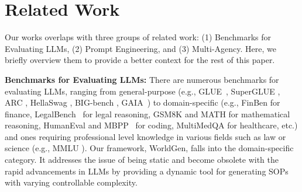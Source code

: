 \section{Related Work}
Our works overlaps with three groups of related work: (1) Benchmarks for Evaluating LLMs, (2) Prompt Engineering, and (3) Multi-Agency. Here, we briefly overview them to provide a better context for the rest of this paper. 

\textbf{Benchmarks for Evaluating LLMs:}  There are numerous benchmarks for evaluating LLMs, ranging from general-purpose (e.g., GLUE~\cite{wang2018glue}, SuperGLUE \cite{wang2019superglue}, ARC \cite{clark2018think}, HellaSwag \cite{zellers2019hellaswag}, BIG-bench \cite{srivastava2022beyond}, GAIA~\cite{gaia}) to domain-specific (e.g., FinBen \cite{xie2024finben} for finance, LegalBench~\cite{guha2024legalbench} for legal reasoning, GSM8K \cite{gsm8k} and MATH \cite{mmlu} for mathematical reasoning, HumanEval \cite{chen2021evaluating} and MBPP~\cite{austin2021program} for coding, MultiMedQA \cite{singhal2023large} for healthcare, etc.) and ones requiring professional level knowledge in various fields such as law or science (e.g., MMLU \cite{mmlu}). Our framework, WorldGen, falls into the domain-specific category. It addresses the issue of being static and become obsolete with the rapid advancements in LLMs by providing a dynamic tool for generating SOPs with varying controllable complexity.

